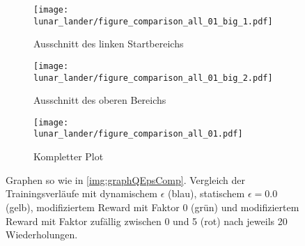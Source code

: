 \begin{figure}[h!]
    \centering
    \begin{subfigure}[b]{0.49\textwidth}
        \texttt{[image: lunar\_lander/figure\_comparison\_all\_01\_big\_1.pdf]}
        \caption{Ausschnitt des linken Startbereichs}
        \label{img:lunarComparisonAll01Big1}
    \end{subfigure}
    \begin{subfigure}[b]{0.49\textwidth}
        \texttt{[image: lunar\_lander/figure\_comparison\_all\_01\_big\_2.pdf]}
        \caption{Ausschnitt des oberen Bereichs}
        \label{img:lunarComparisonAll01Big2}
    \end{subfigure}
    \begin{subfigure}[b]{0.7\textwidth}
        \texttt{[image: lunar\_lander/figure\_comparison\_all\_01.pdf]}
        \caption{Kompletter Plot}
        \label{img:lunarComparisonAll01}
    \end{subfigure}
    \caption{Graphen so wie in \ref{img:graphQEpsComp}. Vergleich der Trainingsverläufe mit dynamischem $ \epsilon $ (blau), statischem $ \epsilon = 0.0 $ (gelb), modifiziertem Reward mit Faktor 0 (grün) und modifiziertem Reward mit Faktor zufällig zwischen 0 und 5 (rot) nach jeweils 20 Wiederholungen.}
    \label{img:lunarComparisonAll01All}
\end{figure}

